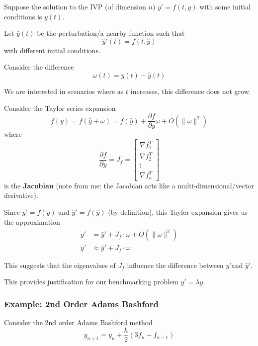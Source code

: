 \documentclass[12pt,letterpaper]{article}
\begin{document}
Suppose the solution to the IVP (of dimension $n$) $y' = f(t, y)$ with some initial conditions is $y(t)$.

Let $\hat{y}(t)$ be the perturbation/a nearby function such that
\begin{equation}
	\hat{y}'(t) = f(t, \hat{y})
\end{equation}
with different initial conditions.

Consider the difference
\begin{equation}
	\omega(t) = y(t) - \hat{y}(t)
\end{equation}

We are interested in scenarios where as $t$ increases, this difference does not grow.

Consider the Taylor series expansion
\begin{equation}
	f(y) = f(\hat{y} + \omega) = f(\hat{y}) + \frac{\partial f}{\partial y} \omega + O(\lVert \omega \rVert^2)
\end{equation}
where
\begin{equation}
\frac{\partial f}{\partial y} = J_f = \begin{bmatrix}
	\nabla f_1^T \\
	\nabla f_2 ^T \\
	\vdots \\
	\nabla f_n ^T
\end{bmatrix}
\end{equation}
is the \textbf{Jacobian} (note from me: the Jacobian acts like a multi-dimensional/vector derivative).

Since $y' = f(y)$ and $\hat{y}' = f(\hat{y})$ (by definition), this Taylor expansion gives us the approximation
\begin{align}
	y' &= \hat{y}' + J_f \cdot \omega + O(\lVert \omega \rVert^2) \\
	y' &\approx \hat{y}' + J_f \cdot \omega
\end{align}

This suggests that the eigenvalues of $J_f$ influence the difference between $y'$and $\hat{y}'$.

This provides justification for our benchmarking problem $y' = \lambda y$.

\subsubsection{Example: 2nd Order Adams Bashford}

Consider the 2nd order Adams Bashford method
\begin{equation}
	y_{n+1} = y_n + \frac{h}{2}(3 f_n - f_{n-1})
\end{equation}
\end{document}

